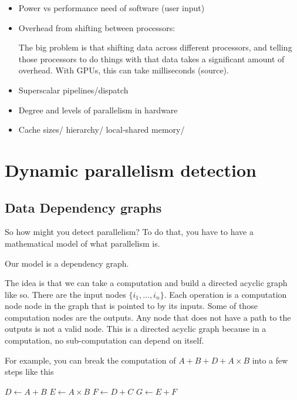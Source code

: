 \documentclass[12pt,twoside]{reedthesis}
\begin{document}
	\begin{itemize}
		\item Power vs performance need of software (user input)
		
		\item Overhead from shifting between processors:
		
		The big problem is that shifting data across different processors, and telling those processors to do things with that data takes a significant amount of overhead. With GPUs, this can take milliseconds (source). 
		
		\item Superscalar pipelines/dispatch
		
		\item Degree and levels of parallelism in hardware
		
		\item Cache sizes/ hierarchy/ local-shared memory/ 
		
	\end{itemize}

\chapter{Dynamic parallelism detection}
	\section{Data Dependency graphs}
		So how might you detect parallelism? To do that, you have to have a mathematical model of what parallelism is. 
		
		Our model is a dependency graph. 
		
		The idea is that we can take a computation and build a directed acyclic graph like so. There are the input nodes $\{i_1,...,i_n\}$. Each operation is a computation node node in the graph that is pointed to by its inputs. Some of those computation nodes are the outputs. Any node that does not have a path to the outputs is not a valid node. This is a directed acyclic graph because in a computation, no sub-computation can depend on itself. 
		
		For example, you can break the computation of $A+B+D+A\times B$ into a few steps like this
		
		\begin{algorithmic}[1]
			\State $D \gets A+B$
			\State $E \gets A\times B$
			\State $F \gets D+C$
			\State $G \gets E+F$
		\end{algorithmic}
		
\end{document}
